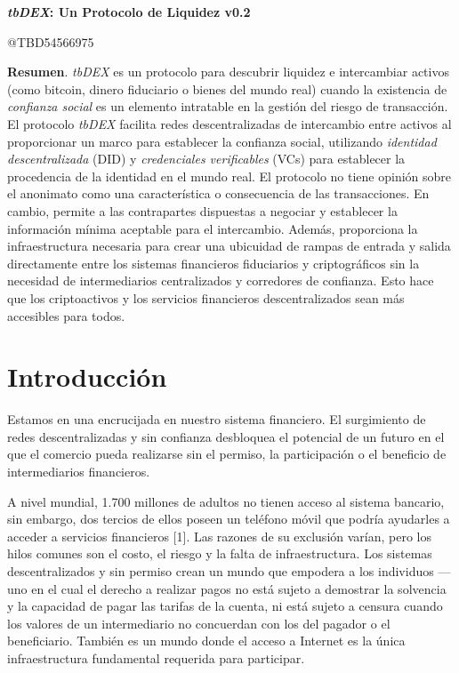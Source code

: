 \documentclass[11pt]{article}
\begin{document}
\begin{center}
{\LARGE \textbf{\textit{tbDEX}: Un Protocolo de Liquidez v0.2}}
\end{center}


\vspace{1\baselineskip}
\begin{center}
{\large \textcolor[HTML]{999999}{@TBD54566975}}
\end{center}


\vspace{2\baselineskip}
\textbf{Resumen}. \textit{tbDEX} es un protocolo para descubrir liquidez e intercambiar activos (como bitcoin, dinero fiduciario o bienes del mundo real) cuando la existencia de \textit{confianza social} es un elemento intratable en la gestión del riesgo de transacción. El protocolo \textit{tbDEX} facilita redes descentralizadas de intercambio entre activos al proporcionar un marco para establecer la confianza social, utilizando \textit{identidad descentralizada} (DID) y \textit{credenciales verificables} (VCs) para establecer la procedencia de la identidad en el mundo real. El protocolo no tiene opinión sobre el anonimato como una característica o consecuencia de las transacciones. En cambio, permite a las contrapartes dispuestas a negociar y establecer la información mínima aceptable para el intercambio. Además, proporciona la infraestructura necesaria para crear una ubicuidad de rampas de entrada y salida directamente entre los sistemas financieros fiduciarios y criptográficos sin la necesidad de intermediarios centralizados y corredores de confianza. Esto hace que los criptoactivos y los servicios financieros descentralizados sean más accesibles para todos.

\vspace{1\baselineskip}
\section{Introducción}

\vspace{1\baselineskip}
Estamos en una encrucijada en nuestro sistema financiero. El surgimiento de redes descentralizadas y sin confianza desbloquea el potencial de un futuro en el que el comercio pueda realizarse sin el permiso, la participación o el beneficio de intermediarios financieros.

\vspace{1\baselineskip}
A nivel mundial, 1.700 millones de adultos no tienen acceso al sistema bancario, sin embargo, dos tercios de ellos poseen un teléfono móvil que podría ayudarles a acceder a servicios financieros [1]. Las razones de su exclusión varían, pero los hilos comunes son el costo, el riesgo y la falta de infraestructura. Los sistemas descentralizados y sin permiso crean un mundo que empodera a los individuos \textcolor[HTML]{202124}{— uno en el cual} el derecho a realizar pagos no está sujeto a demostrar la solvencia y la capacidad de pagar las tarifas de la cuenta, ni está sujeto a censura cuando los valores de un intermediario no concuerdan con los del pagador o el beneficiario. También es un mundo donde el acceso a Internet es la única infraestructura fundamental requerida para participar.
\end{document}
